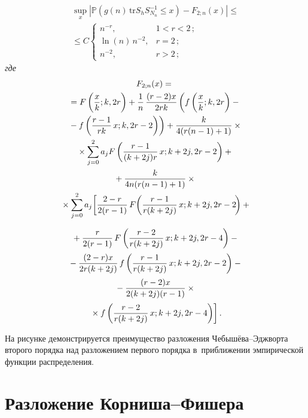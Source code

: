 \begin{multicols}{2}

\noindent
\begin{multline}
\label{eq10q}
\sup\limits_{x} \left\vert \mathbb{P}\left( g(n) \,\textrm{tr} S_h 
S^{-1}_{N_n} \leq x\right) - F_{2; n}(x) \right\vert \leq{}\\
{}\leq  C  
\begin{cases} 
n^{- r}, &  1 < r < 2\,;\\ 
\ln(n) \, n^{- 2}, &   r  = 2\,; \\ 
n^{- 2}, & r > 2\,;
 \end{cases}
\end{multline}
\textit{где}
\begin{multline*}
F_{2;n}(x) ={}\\
{}= F\left(\fr{x}{k};k,2r\right)
+ \fr{1}{n}\,\fr{(r-2)x}{2rk} \left(f\left(\fr{x}{k};k,2r\right) - {}\right.\\
\left.{}-
f\left( \fr{r-1}{rk}\,x;k,2r-2\right)\right) + 
\fr{k}{4(r(n-1)+1)}\times{}\\
{}\times \sum\limits_{j=0}^{2} a_j  F\left( \fr{r-1}{(k+2j)r} 
\,x;k+2j,2r-2\right) + {}\\
{}+ \fr{k}{4n(r(n-1)+1)} \times{}\\
{}\times 
\sum\limits_{j=0}^{2} a_j \! \left[ \fr{2-r}{2(r-1)} 
\,F\!\left( \fr{r-1}{r(k+2j)}\,x;k+2j,2r-2\!\right) +{} \right.\hspace*{-3.20157pt}
\end{multline*}

\noindent
\begin{multline*}
{}+\fr{r}{2(r-1)}\,F\left( \fr{r-2}{r(k+2j)} \,x;k+2j,2r-4\right)
-{}\\[2pt]
{}- \fr{(2-r)x}{2r(k+2j)} \,f\left( \fr{r-1}{r(k+2j)}\,x;k+2j,2r-2\right) - 
{}\\[2pt]
 {}- \fr{(r-2)x}{2(k+2j)(r-1)}\times{}\\[2pt]
\left.{}\times f\left( \fr{r-2}{r(k+2j)} 
\,x;k+2j,2r-4\right) \right]. 
\end{multline*}





На рисунке демонстрируется преимущество разложения 
Че\-бы\-шё\-ва--Эдж\-вор\-та второго порядка над разложением первого порядка в~приближении 
эмпирической функции распределения.



\section{Разложение Корниша--Фишера}


\end{multicols}
